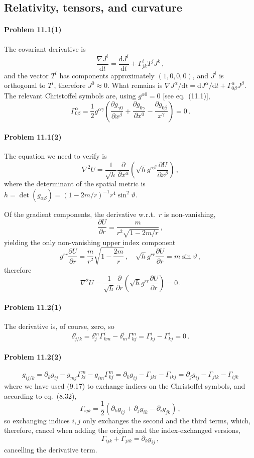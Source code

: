 \documentclass[a4paper,12pt]{article}
\def\d{\mathrm{d}}
\newcommand{\problem}[1]{\paragraph{Problem #1}}
\begin{document}

\subsection{Relativity, tensors, and curvature}


\problem{11.1(1)} The covariant derivative is
\[
 \frac{\nabla J^i}{\d t} = \frac{\d J^i}{\d t} + \Gamma^{i}_{jk}T^j J^k\,,
\]
and the vector $T^i$ has components approximately $(1, 0, 0, 0)$, and $J^i$ is orthogonal to $T^i$, therefore $J^0\approx 0$. What remains is $\nabla J^\alpha/\d t = \d J^\alpha/\d t + \Gamma^\alpha_{0\beta}J^\beta$. The relevant Christoffel symbols are, using $g^{\alpha0}=0$ [see eq.\ (11.1)],
\[
 \Gamma^\alpha_{0\beta} = \frac{1}{2}g^{\alpha \gamma}\left( \frac{\partial g_{\gamma 0}}{\partial x^\beta}+\frac{\partial g_{0\gamma}}{\partial x^0}-\frac{\partial g_{0\beta}}{x^\gamma}\right)=0\,.
\]


\problem{11.1(2)} The equation we need to verify is
\[
 \nabla^2 U = \frac{1}{\sqrt{h}}\frac{\partial}{\partial x^\alpha}\left(\sqrt{h}g^{\alpha\beta}\frac{\partial U}{\partial x^\beta}\right)\,,
\]
where the determinant of the spatial metric is $h = \det(g_{\alpha\beta})=(1-2m/r)^{-1}r^4 \sin^2\vartheta$.

Of the gradient components, the derivative w.r.t.\ $r$  is non-vanishing,
\[
 \frac{\partial U}{\partial r} = \frac{m}{r^2\sqrt{1-2m/r}}\,,
\]
yielding the only non-vanishing upper index component
\[
 g^{rr}\frac{\partial U}{\partial r} = \frac{m}{r^2}\sqrt{1-\frac{2m}{r}}\,,\quad \sqrt{h}g^{rr}\frac{\partial U}{\partial r} = m\sin\vartheta\,,
\]
therefore
\[
 \nabla^2 U = \frac{1}{\sqrt{h}}\frac{\partial}{\partial r}\left( \sqrt{h}g^{rr}\frac{\partial U}{\partial r}\right)=0\,.
\]


\problem{11.2(1)} The derivative is, of course, zero, so
\[
 \delta^i_{j/k} = \delta^m_j \Gamma^i_{km} - \delta^i_m \Gamma^m_{kj} = \Gamma^i_{kj} - \Gamma^i_{kj} = 0\,.
\]


\problem{11.2(2)}
\[
 g_{ij/k} = \partial_k g_{ij}-g_{mj}\Gamma^m_{ki}-g_{im}\Gamma^m_{kj} = \partial_kg_{ij}-\Gamma_{jki}-\Gamma_{ikj} = \partial_jg_{ij}-\Gamma_{jik}-\Gamma_{ijk}
\]
where we have used (9.17) to exchange indices on the Christoffel symbols, and according to eq.\ (8.32),
\[
 \Gamma_{ijk}=\frac{1}{2}\left( \partial_kg_{ij} + \partial_jg_{ik}-\partial_ig_{jk}\right)\,,
\]
so exchanging indices $i,j$ only exchanges the second and the third terms, which, therefore, cancel when adding the original and the index-exchanged versions,
\[
 \Gamma_{ijk}+\Gamma_{jik} = \partial_k g_{ij}\,,
\]
cancelling the derivative term.
\end{document}

